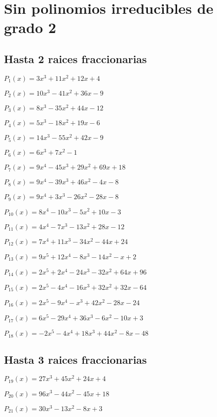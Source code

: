 \section{Sin polinomios irreducibles de grado 2}
\subsection{Hasta 2 raices fraccionarias}

\subitem $P_{1}(x) = 3x^3 + 11x^2 + 12x + 4$

\subitem $P_{2}(x) = 10x^3 - 41x^2 + 36x - 9$

\subitem $P_{3}(x) = 8x^3 - 35x^2 + 44x - 12$

\subitem $P_{4}(x) = 5x^3 - 18x^2 + 19x - 6$

\subitem $P_{5}(x) = 14x^3 - 55x^2 + 42x - 9$

\subitem $P_{6}(x) = 6x^3 + 7x^2 - 1$


\subitem $P_{7}(x) = 9x^4 - 45x^3 + 29x^2 + 69x + 18$

\subitem $P_{8}(x) = 9x^4 - 39x^3 + 46x^2 - 4x - 8$

\subitem $P_{9}(x) = 9x^4 + 3x^3 - 26x^2 - 28x - 8$

\subitem $P_{10}(x) = 8x^4 - 10x^3 - 5x^2 + 10x - 3$

\subitem $P_{11}(x) = 4x^4 - 7x^3 - 13x^2 + 28x - 12$

\subitem $P_{12}(x) = 7x^4 + 11x^3 - 34x^2 - 44x + 24$


\subitem $P_{13}(x) = 9x^5 + 12x^4 - 8x^3 - 14x^2 - x + 2$

\subitem $P_{14}(x) = 2x^5 + 2x^4 - 24x^3 - 32x^2 + 64x + 96$

\subitem $P_{15}(x) = 2x^5 - 4x^4 - 16x^3 + 32x^2 + 32x - 64$

\subitem $P_{16}(x) = 2x^5 - 9x^4 - x^3 + 42x^2 - 28x - 24$

\subitem $P_{17}(x) = 6x^5 - 29x^4 + 36x^3 - 6x^2 - 10x + 3$

\subitem $P_{18}(x) = -2x^5 - 4x^4 + 18x^3 + 44x^2 - 8x - 48$

\subsection{Hasta 3 raices fraccionarias}

\subitem $P_{19}(x) = 27x^3 + 45x^2 + 24x + 4$

\subitem $P_{20}(x) = 96x^3 - 44x^2 - 45x + 18$

\subitem $P_{21}(x) = 30x^3 - 13x^2 - 8x + 3$

